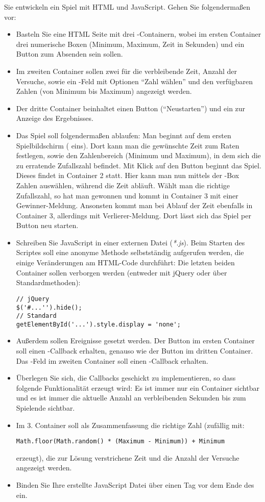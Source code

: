 %
\par Sie entwickeln ein Spiel mit HTML und JavaScript. Gehen Sie folgendermaßen
vor:
%
\begin{itemize}
\item
Basteln Sie eine HTML Seite mit drei -Containern, wobei im ersten
Container drei numerische Boxen (Minimum, Maximum, Zeit in Sekunden) und ein
Button zum Absenden sein sollen.
\item
Im zweiten Container sollen zwei  für die verbleibende Zeit, Anzahl der
Versuche, sowie ein -Feld mit Optionen ``Zahl wählen'' und den
verfügbaren Zahlen (von Minimum bis Maximum) angezeigt werden.
\item
Der dritte Container beinhaltet einen Button (``Neustarten'') und ein 
zur Anzeige des Ergebnisses.
\item
Das Spiel soll folgendermaßen ablaufen: Man beginnt auf dem ersten Spielbildschirm ( eins). Dort kann man die gewünschte Zeit zum Raten festlegen, sowie den Zahlenbereich (Minimum und Maximum), in dem sich die zu erratende Zufallszahl befindet. Mit Klick auf den Button beginnt das Spiel. Dieses findet in Container 2 statt. Hier kann man nun mittels der -Box Zahlen auswählen, während die Zeit abläuft. Wählt man die richtige Zufallszahl, so hat man gewonnen und kommt in Container 3 mit einer Gewinner-Meldung. Ansonsten kommt man bei Ablauf der Zeit ebenfalls in Container 3, allerdings mit Verlierer-Meldung. Dort lässt sich das Spiel per Button neu starten.
\item
Schreiben Sie JavaScript in einer externen Datei (\emph{*.js}). Beim Starten
des Scriptes soll eine anonyme Methode selbstständig aufgerufen werden, die
einige Veränderungen am HTML-Code durchführt: Die letzten beiden Container
sollen verborgen werden (entweder mit jQuery oder über Standardmethoden):
%
\begin{lstlisting}
// jQuery
$('#...'').hide();
// Standard
getElementById('...').style.display = 'none';
\end{lstlisting}
%
\item
Außerdem sollen Ereignisse gesetzt werden. Der Button im ersten Container soll
einen -Callback erhalten, genauso wie der Button im dritten
Container. Das -Feld im zweiten Container soll einen
-Callback erhalten.
\item
Überlegen Sie sich, die Callbacks geschickt zu implementieren, so dass folgende
Funktionalität erzeugt wird: Es ist immer nur ein Container sichtbar und es
ist immer die aktuelle Anzahl an verbleibenden Sekunden bis zum Spielende
sichtbar.
\item
Im 3. Container soll als Zusammenfassung die richtige Zahl (zufällig mit:
%
\begin{lstlisting}
Math.floor(Math.random() * (Maximum - Minimum)) + Minimum
\end{lstlisting}
%
erzeugt), die zur Lösung verstrichene Zeit und die Anzahl der Versuche
angezeigt werden.
\item
Binden Sie Ihre erstellte JavaScript Datei über einen  Tag vor dem
Ende des  ein.
\end{itemize}